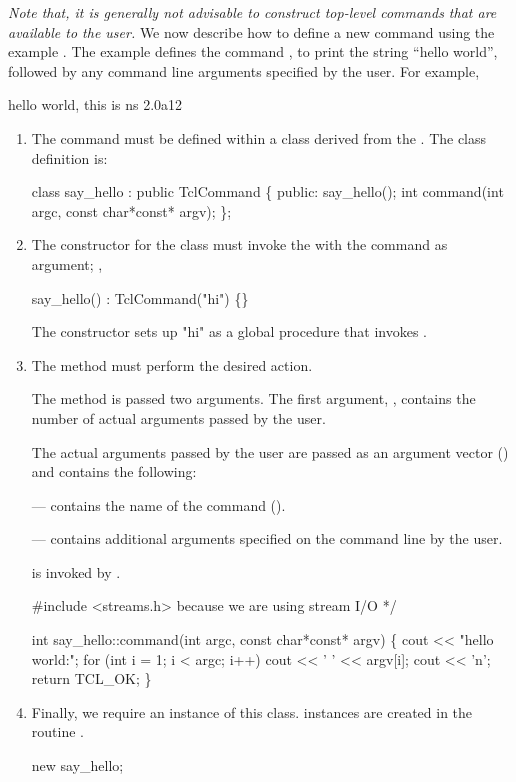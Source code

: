 \emph{Note that, it is generally not advisable to construct
  top-level commands that are available to the user.}
We now describe how to define a new command
using the example .
The example defines the command ,
to print the string ``hello world'',
followed by any command line arguments specified by the user.
For example,
\begin{program}
            hello world, this is ns 2.0a12
\end{program}
\begin{enumerate}
\item The command must be defined within a class
  derived from the .
  The class definition is:
  \begin{program}
        class say_hello : public TclCommand \{
        public:
                say_hello();
                int command(int argc, const char*const* argv);
        \};
  \end{program}
\item The constructor for the class must invoke the
  with the command as argument; \ie,
  \begin{program}
        say_hello() : TclCommand("hi") \{\}
  \end{program}
  The  constructor sets up "hi"
  as a global procedure that invokes
  .
\item  The method  must perform the desired action.

  The method is passed two arguments.  The first argument, ,
  contains the number of actual arguments passed by the user.

  The actual arguments passed by the user are passed as an
  argument vector () and contains the following:
  
  ---  contains the name of the command ().

  ---  contains additional arguments
  specified on the command line by the user.

   is invoked by .
\begin{program}
        #include <streams.h>        \* because we are using stream I/O */
        
        int say_hello::command(int argc, const char*const* argv) \{
                cout << "hello world:";
                for (int i = 1; i < argc; i++)
                        cout << ' ' << argv[i];
                cout << '\bs n';
                return TCL_OK;
        \}
\end{program}
\item Finally, we require an instance of this class.
   instances are created in the routine
  .
  \begin{program}
        new say_hello;
  \end{program}
\end{enumerate}
